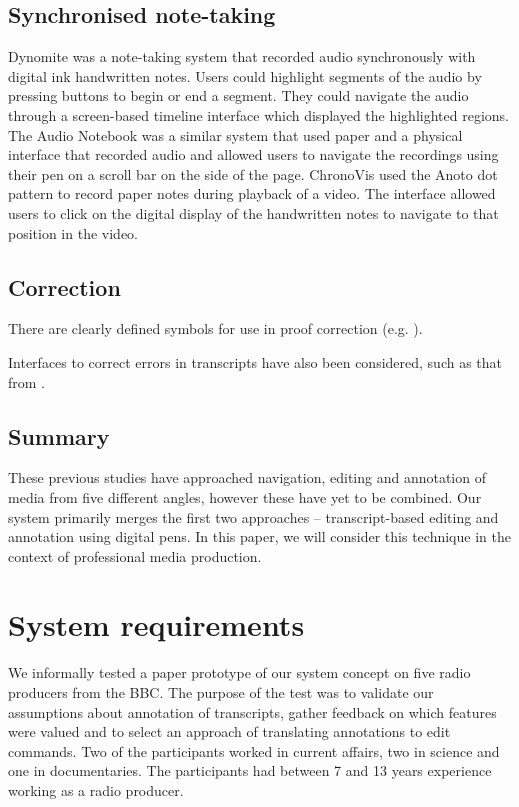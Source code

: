 \subsection{Synchronised note-taking}
Dynomite \citep{Wilcox1997} was a note-taking system that recorded audio synchronously with digital ink handwritten
notes.  Users could highlight segments of the audio by pressing buttons to begin or end a segment. They could navigate
the audio through a screen-based timeline interface which displayed the highlighted regions.  The Audio Notebook
\citep{Stifelman2001} was a similar system that used paper and a physical interface that recorded audio and allowed
users to navigate the recordings using their pen on a scroll bar on the side of the page.  ChronoVis \citep{Fouse2011}
used the Anoto dot pattern to record paper notes during playback of a video. The interface allowed users to click on
the digital display of the handwritten notes to navigate to that position in the video.

\subsection{Correction}
There are clearly defined symbols for use in proof correction (e.g. \citet{ISO5776}).

Interfaces to correct errors in transcripts have also been considered, such as that from \citet{Suhm2001}.

\subsection{Summary}
These previous studies have approached navigation, editing and annotation of media from five different angles, however
these have yet to be combined.  Our system primarily merges the first two approaches -- transcript-based editing and
annotation using digital pens. In this paper, we will consider this technique in the context of professional media
production.

\section{System requirements}\label{sec:paper-requirements}




We informally tested a paper prototype of our system concept on five radio producers from the BBC. The purpose of the
test was to validate our assumptions about annotation of transcripts, gather feedback on which features were valued and
to select an approach of translating annotations to edit commands.  Two of the participants worked in current affairs,
two in science and one in documentaries. The participants had between 7 and 13 years experience working as a radio
producer.

